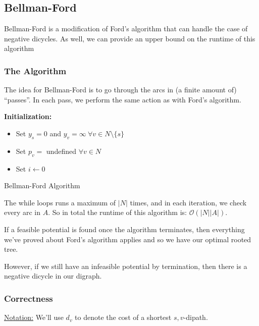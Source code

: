 \subsection{Bellman-Ford}
Bellman-Ford is a modification of Ford's algorithm that can handle the case of negative dicycles.
As well, we can provide an upper bound on the runtime of this algorithm

\subsubsection{The Algorithm}
The idea for Bellman-Ford is to go through the arcs in (a finite amount of) ``passes''.
In each pass, we perform the same action as with Ford's algorithm.

\IncMargin{1em}
\begin{algorithm}[H]\label{alg:bellman-ford}  
  \nl \textbf{Initialization:}
  \begin{itemize}
      \item Set $y_s = 0$ and $y_v = \infty\:\forall v \in N\setminus\{s\}$ 
      \item Set $p_v =$ undefined $\forall v \in N$
      \item Set $i \leftarrow 0$
  \end{itemize}

  \nl {}

  \caption{Bellman-Ford Algorithm}
\end{algorithm}

The while loops runs a maximum of $|N|$ times, and in each iteration, we check every arc in $A$. So in total the runtime of this algorithm is: $\mathcal{O}(|N||A|)$.

If a feasible potential is found once the algorithm terminates, then everything we've proved about Ford's algorithm applies and so we have our optimal rooted tree.

However, if we still have an infeasible potential by termination, then there is a negative dicycle in our digraph.

\subsubsection{Correctness}
\underline{Notation:} We'll use $d_v$ to denote the cost of a shortest $s,v$-dipath.

